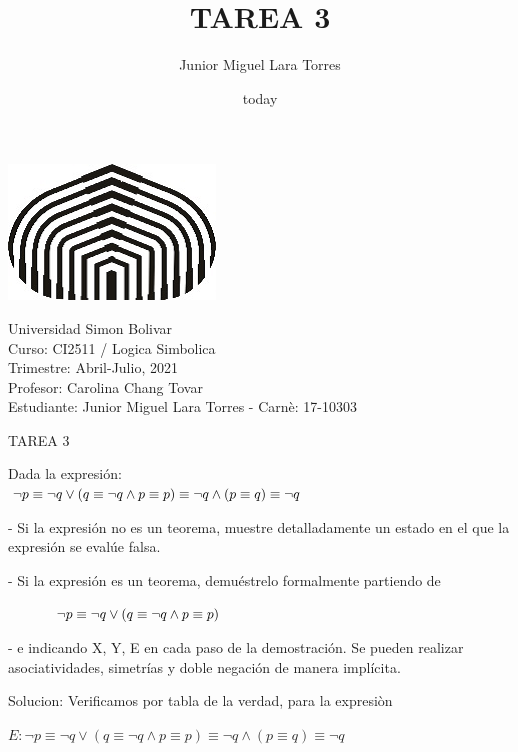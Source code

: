 \documentclass[a4paper,12pt]{article}
\title{TAREA 3}
\author{Junior Miguel Lara Torres}
\date{today}
\begin{document}
\begin{center}
\par \includegraphics[scale=1]{USB} \par
Universidad Simon Bolivar \\ Curso: CI2511 / Logica Simbolica \\ Trimestre: Abril-Julio, 2021 \\ Profesor: Carolina Chang Tovar \\ Estudiante: Junior Miguel Lara Torres - Carnè: 17-10303 \\
\end{center}

\begin{center}
TAREA 3
\end{center}

Dada la expresión: \\

$ \neg p \equiv \neg q \vee (q \equiv \neg q \wedge p \equiv p) \equiv \neg q \wedge (p \equiv q)\equiv \neg q \\ $ \par

- Si la expresión no es un teorema, muestre detalladamente un estado en el que la expresión se evalúe falsa.\par
- Si la expresión es un teorema, demuéstrelo formalmente partiendo de \par
$\\ ~~~~~~~~~~ \neg p \equiv \neg q \vee (q \equiv \neg q \wedge p \equiv p)\\ $ \par

- e indicando X, Y, E en cada paso de la demostración. Se pueden realizar asociatividades, simetrías y doble negación de manera implícita. \\ \par

Solucion: Verificamos por tabla de la verdad, para la expresiòn 

\begin{center}
$E: \neg p \equiv \neg q \vee (q \equiv \neg q \wedge p \equiv p) \equiv \neg q \wedge (p \equiv q)\equiv \neg q$
\end{center} 
\end{document}

